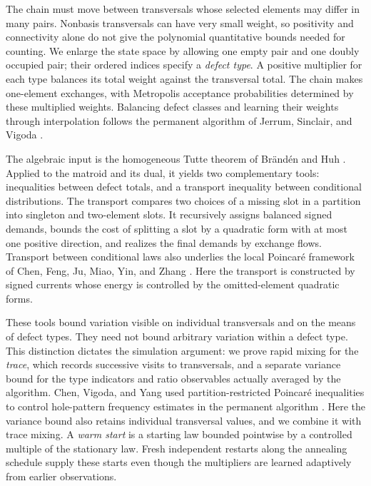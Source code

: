 \documentclass[11pt]{article}
\theoremstyle{definition}
\begin{document}
The chain must move between transversals whose selected elements may
differ in many pairs.  Nonbasis transversals can have very small weight,
so positivity and connectivity alone do not give the polynomial
quantitative bounds needed for counting.  We enlarge the state space by
allowing one empty pair and one doubly occupied pair; their ordered indices specify a
\emph{defect type}.  A positive multiplier for each type balances its
total weight against the transversal total.  The chain makes one-element
exchanges, with Metropolis acceptance probabilities determined by these
multiplied weights.  Balancing defect classes and learning their weights
through interpolation follows the permanent algorithm of Jerrum,
Sinclair, and Vigoda \cite{JSV2004}.

The algebraic input is the homogeneous Tutte theorem of Br\"and\'en and
Huh \cite{BH2020}.  Applied to the matroid and its dual, it yields two
complementary tools: inequalities between defect totals, and a transport
inequality between conditional distributions.  The transport compares
two choices of a missing slot in a partition into singleton and
two-element slots.  It recursively assigns balanced signed demands,
bounds the cost of splitting a slot by a quadratic form with at most one positive
direction, and realizes the final demands by exchange flows.
Transport between conditional laws also underlies the local Poincar\'e
framework of Chen, Feng, Ju, Miao, Yin, and Zhang
\cite{CFJMYZ2025}.  Here the transport is constructed by signed currents
whose energy is controlled by the omitted-element quadratic forms.

These tools bound variation visible on individual transversals and on
the means of defect types.  They need not bound arbitrary variation
within a defect type.  This distinction dictates the simulation argument:
we prove rapid mixing for the \emph{trace}, which records successive
visits to transversals, and a separate variance bound for the type
indicators and ratio observables actually averaged by the algorithm.
Chen, Vigoda, and Yang used partition-restricted Poincar\'e inequalities
to control hole-pattern frequency estimates in the permanent algorithm
\cite{CVY2026}.  Here the variance bound also retains individual
transversal values, and we combine it with trace mixing.
A \emph{warm start} is a starting law bounded pointwise by a controlled
multiple of the stationary law.  Fresh independent restarts along the
annealing schedule supply these starts even though the multipliers are
learned adaptively from earlier observations.
\end{document}
